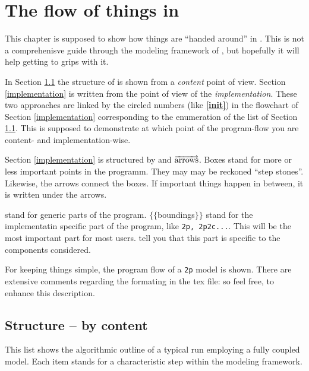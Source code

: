 
\newcommand{\nextline}{\par\phantom{a}\vspace*{0.1\textwidth}}
\chapter{The flow of things in \Dumux}

This chapter is supposed to show how things are ``handed around'' in \Dumux. This is not a comprehenisve guide through the modeling framework of \Dumux, but hopefully it will help getting to grips with it. 

In Section \ref{content} the structure of \Dumux is shown from a \emph{content} point of view.
Section \ref{implementation} is written from the point of view of the \emph{implementation}. These two approaches are linked by the circled numbers (like \textbf{\textcircled{\ref{init}}}) in the flowchart of Section \ref{implementation} corresponding to the enumeration of the list of Section \ref{content}. This is supposed to demonstrate at which point of the program-flow you are content- and implementation-wise. 

Section \ref{implementation} is structured by  and $\overrightarrow{\textnormal{arrows}}$. Boxes stand for more or less important points in the programm. They may may be reckoned ``step stones''. Likewise, the arrows connect the boxes. If important things happen in between, it is written under the arrows.

 stand for generic parts of the program.  $\lbrace\lbrace$boundings$\rbrace\rbrace$ stand for the implementatin specific part of the program, like \verb+2p, 2p2c...+. This will be the most important part for most users.  tell you that this part is specific to the components considered. 

For keeping things simple, the program flow of a \verb+2p+ model is shown.
There are extensive comments regarding the formating in the tex file: so feel free, to enhance this description.

\section{Structure -- by content}
\label{content}
This list shows the algorithmic outline of a typical \Dumux run employing a fully coupled model. Each item stands for a characteristic step within the modeling framework. 


